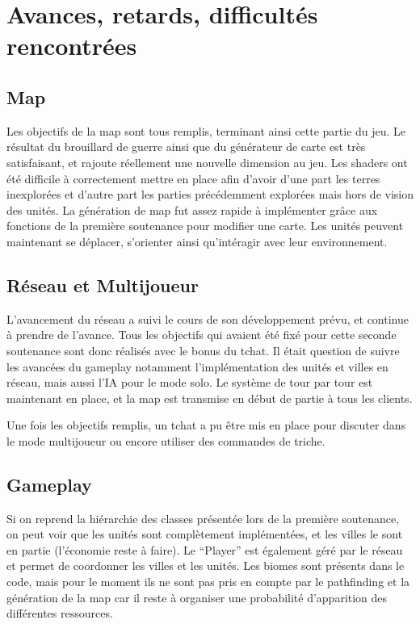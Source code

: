 \documentclass[12pt]{report}
\begin{document}
\chapter{Avances, retards, difficultés rencontrées}

\section*{Map}

Les objectifs de la map sont tous remplis, terminant ainsi cette partie du jeu.
Le résultat du brouillard de guerre ainsi que du générateur de carte est très
satisfaisant, et rajoute réellement une nouvelle dimension au jeu. Les shaders
ont été difficile à correctement mettre en place afin d'avoir d'une part les
terres inexplorées et d'autre part les parties précédemment explorées mais hors
de vision des unités. La génération de map fut assez rapide à implémenter grâce
aux fonctions de la première soutenance pour modifier une carte. Les unités
peuvent maintenant se déplacer, s'orienter ainsi qu'intéragir avec leur
environnement.

\section*{Réseau et Multijoueur}

L’avancement du réseau a suivi le cours de son développement prévu, et continue
à prendre de l'avance. Tous les objectifs qui avaient été fixé pour cette
seconde soutenance sont donc réalisés avec le bonus du tchat. Il était question
de suivre les avancées du gameplay notamment l'implémentation des unités et
villes en réseau, mais aussi l'IA pour le mode solo. Le système de tour par tour
est maintenant en place, et la map est transmise en début de partie à tous les
clients.

Une fois les objectifs remplis, un tchat a pu être mis en place pour discuter
dans le mode multijoueur ou encore utiliser des commandes de triche.

\section*{Gameplay}

Si on reprend la hiérarchie des classes présentée lors de la première
soutenance, on peut voir que les unités sont complètement implémentées, et les
villes le sont en partie (l’économie reste à faire). Le “Player” est également
géré par le réseau et permet de coordonner les villes et les unités.  Les biomes
sont présents dans le code, mais pour le moment ils ne sont pas pris en compte
par le pathfinding et la génération de la map car il reste à organiser une
probabilité d’apparition des différentes ressources.
\end{document}
